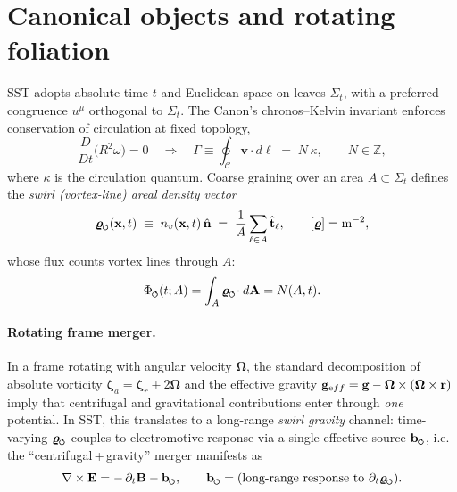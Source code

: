 \documentclass[reprint,aps,onecolumn,nofootinbib]{revtex4-2}
\newcommand{\swirlarrow}{%
	\mathchoice{\mkern-2mu\scriptstyle\boldsymbol{\circlearrowleft}}%
	{\mkern-2mu\scriptstyle\boldsymbol{\circlearrowleft}}%
	{\mkern-2mu\scriptscriptstyle\boldsymbol{\circlearrowleft}}%
	{\mkern-2mu\scriptscriptstyle\boldsymbol{\circlearrowleft}}%
}
\begin{document}
\section{Canonical objects and rotating foliation}
    SST adopts absolute time $t$ and Euclidean space on leaves $\Sigma_t$, with a preferred congruence $u^\mu$ orthogonal to $\Sigma_t$. The Canon’s chronos--Kelvin invariant enforces conservation of circulation at fixed topology,
    \begin{equation}
    \frac{D}{Dt}\Big(R^2\omega\Big)=0
    \quad\Longrightarrow\quad
    \Gamma\equiv\oint_{\mathcal C}\mathbf v\!\cdot d\boldsymbol\ell \;=\; N\,\kappa,\qquad N\in\mathbb Z,
    \label{eq:Kelvin}
    \end{equation}
    where $\kappa$ is the circulation quantum. Coarse graining over an area $A\subset\Sigma_t$ defines the \emph{swirl (vortex-line) areal density vector}
    \begin{equation}
    \bm{\varrho}_{\swirlarrow}(\mathbf x,t) \;\equiv\; n_v(\mathbf x,t)\,\hat{\mathbf n} \;=\; \frac{1}{A}\sum_{\ell\in A}\hat{\mathbf t}_\ell,
    \qquad [\bm{\varrho}]={\textrm m^{-2}},
    \label{eq:rho_def}
    \end{equation}
    whose flux counts vortex lines through $A$:
    \begin{equation}
    \Phi_{\swirlarrow}(t;A)=\int_A \bm{\varrho}_{\swirlarrow}\!\cdot d\mathbf A = N(A,t).
    \label{eq:swflux}
    \end{equation}

    \paragraph{Rotating frame merger.}
        In a frame rotating with angular velocity $\boldsymbol\Omega$, the standard decomposition of absolute vorticity $\boldsymbol\zeta_a=\boldsymbol\zeta_r+2\boldsymbol\Omega$ and the effective gravity $\mathbf g_{\textrm eff}=\mathbf g-\boldsymbol\Omega\times(\boldsymbol\Omega\times\mathbf r)$ imply that centrifugal and gravitational contributions enter through \emph{one} potential. In SST, this translates to a long-range \emph{swirl gravity} channel: time-varying $\bm{\varrho}_{\swirlarrow}$ couples to electromotive response via a single effective source $\mathbf b_{\swirlarrow}$, i.e. the ``centrifugal\,+\,gravity'' merger manifests as
        \begin{equation}
        \nabla\times\mathbf E = -\,\partial_t\mathbf B - \mathbf b_{\swirlarrow},
        \qquad \mathbf b_{\swirlarrow}=\text{(long-range response to }\partial_t \bm{\varrho}_{\swirlarrow}\text{)}.
        \label{eq:Faraday_mod}
        \end{equation}
\end{document}
